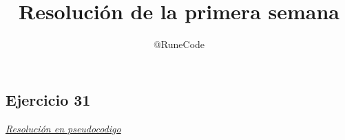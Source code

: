 \documentclass{article}
\title{Resolución de la primera semana}
\author{@RuneCode}
\begin{document}
%

\subsection*{Ejercicio 31}%

\underline{\textit{Resolución en pseudocodigo}}\\
\inputminted{./pseudocode.py:PseudocodeLexer -x}{./pseudocodigo/031_pseudo.algo}



%
%
%
%
%
%
\end{document}
